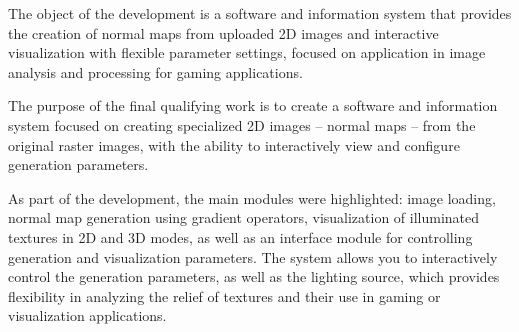 The object of the development is a software and information system that provides the creation of normal maps from uploaded 2D images and interactive visualization with flexible parameter settings, focused on application in image analysis and processing for gaming applications.

The purpose of the final qualifying work is to create a software and information system focused on creating specialized 2D images -- normal maps -- from the original raster images, with the ability to interactively view and configure generation parameters.

As part of the development, the main modules were highlighted: image loading, normal map generation using gradient operators, visualization of illuminated textures in 2D and 3D modes, as well as an interface module for controlling generation and visualization parameters. The system allows you to interactively control the generation parameters, as well as the lighting source, which provides flexibility in analyzing the relief of textures and their use in gaming or visualization applications.
